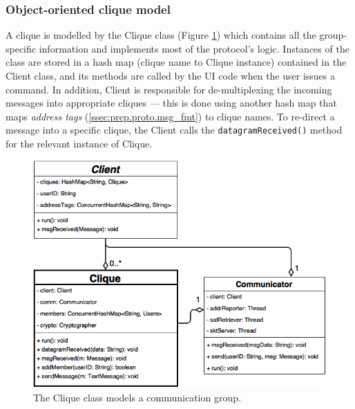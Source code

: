 \documentclass[a4paper, twoside, 12pt]{report}
\begin{document}
\subsubsection{Object-oriented clique model}
A clique is modelled by the Clique class (Figure \ref{fig:clique_uml}) which contains all the group-specific information and implements most of the protocol's logic. Instances of the class are stored in a hash map (clique name to Clique instance) contained in the Client class, and its methods are called by the UI code when the user issues a command. In addition, Client is responsible for de-multiplexing the incoming messages into appropriate cliques --- this is done using another hash map that maps \emph{address tags} (\cref{ssec:prep.proto.msg_fmt}) to clique names. To re-direct a message into a specific clique, the Client calls the \texttt{datagramReceived()} method for the relevant instance of Clique.
\begin{figure}[H]
    \centering
    \includegraphics[width=0.8\linewidth]{pics/clique_uml.png}
    \caption{\label{fig:clique_uml} The Clique class models a communication group.}
\end{figure}
\end{document}
